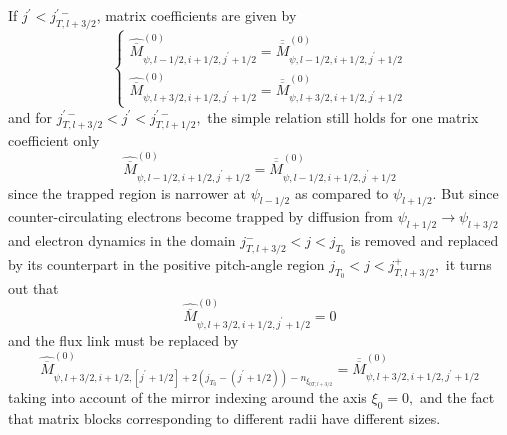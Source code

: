 If $j^{\prime }<j_{T,l+3/2}^{\prime -}$, matrix coefficients are given by
\begin{equation}
\left\{
\begin{array}{l}
\widehat{\overline{M}}_{\psi ,l-1/2,i+1/2,j^{\prime }+1/2}^{\left( 0\right)
}=\overline{\overline{M}}_{\psi ,l-1/2,i+1/2,j^{\prime }+1/2}^{\left(
0\right) } \\
\widehat{\overline{M}}_{\psi ,l+3/2,i+1/2,j^{\prime }+1/2}^{\left( 0\right)
}=\overline{\overline{M}}_{\psi ,l+3/2,i+1/2,j^{\prime }+1/2}^{\left(
0\right) }
\end{array}
\right.
\end{equation}
and for $j_{T,l+3/2}^{\prime -}<j^{\prime }<j_{T,l+1/2}^{\prime -},$ the
simple relation still holds for one matrix coefficient only
\begin{equation}
\widehat{\overline{M}}_{\psi ,l-1/2,i+1/2,j^{\prime }+1/2}^{\left( 0\right)
}=\overline{\overline{M}}_{\psi ,l-1/2,i+1/2,j^{\prime }+1/2}^{\left(
0\right) }
\end{equation}
since the trapped region is narrower at $\psi _{l-1/2}$ as compared to $\psi
_{l+1/2}.$ But since counter-circulating electrons become trapped by
diffusion from $\psi _{l+1/2}\rightarrow \psi _{l+3/2}$ and electron
dynamics in the domain $j_{T,l+3/2}^{-}<j<j_{T_{0}}$ is removed and replaced
by its counterpart in the positive pitch-angle region $%
j_{T_{0}}<j<j_{T,l+3/2}^{+},$ it turns out that
\begin{equation}
\widehat{\overline{M}}_{\psi ,l+3/2,i+1/2,j^{\prime }+1/2}^{\left( 0\right)
}=0
\end{equation}
and the flux link must be replaced by
\begin{equation}
\widehat{\overline{M}}_{\psi ,l+3/2,i+1/2,\left[ j^{\prime }+1/2\right]
+2\left( j_{T_{0}}-\left( j^{\prime }+1/2\right) \right) -n_{\xi
_{0T,l+3/2}}}^{\left( 0\right) }=\overline{\overline{M}}_{\psi
,l+3/2,i+1/2,j^{\prime }+1/2}^{\left( 0\right) }
\end{equation}
taking into account of the mirror indexing around the axis $\xi _{0}=0,$ and
the fact that matrix blocks corresponding to different radii have different
sizes.

